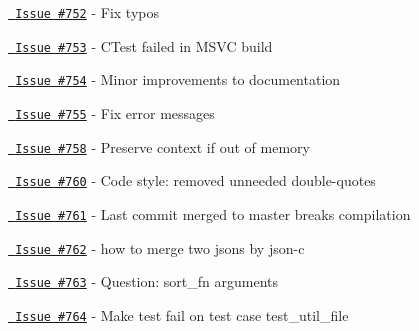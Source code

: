 \begin{DoxyItemize}
\item \href{https://github.com/json-c/json-c/issues/752}{\texttt{ Issue \#752}} -\/ Fix typos
\item \href{https://github.com/json-c/json-c/issues/753}{\texttt{ Issue \#753}} -\/ CTest failed in MSVC build
\item \href{https://github.com/json-c/json-c/issues/754}{\texttt{ Issue \#754}} -\/ Minor improvements to documentation
\item \href{https://github.com/json-c/json-c/issues/755}{\texttt{ Issue \#755}} -\/ Fix error messages
\item \href{https://github.com/json-c/json-c/issues/758}{\texttt{ Issue \#758}} -\/ Preserve context if out of memory
\item \href{https://github.com/json-c/json-c/issues/760}{\texttt{ Issue \#760}} -\/ Code style\+: removed unneeded double-\/quotes
\item \href{https://github.com/json-c/json-c/issues/761}{\texttt{ Issue \#761}} -\/ Last commit merged to master breaks compilation
\item \href{https://github.com/json-c/json-c/issues/762}{\texttt{ Issue \#762}} -\/ how to merge two jsons by json-\/c
\item \href{https://github.com/json-c/json-c/issues/763}{\texttt{ Issue \#763}} -\/ Question\+: sort\+\_\+fn arguments
\item \href{https://github.com/json-c/json-c/issues/764}{\texttt{ Issue \#764}} -\/ Make test fail on test case test\+\_\+util\+\_\+file 
\end{DoxyItemize}